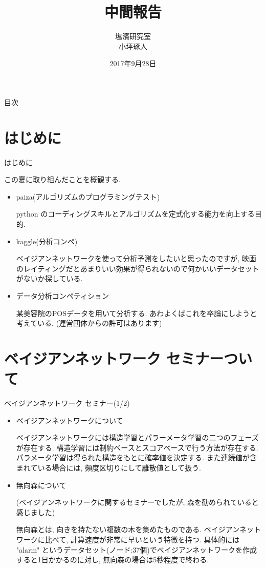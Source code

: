 \documentclass[dvipdfmx]{beamer}
\title[タイトル]{中間報告}
\author[発表者名]{塩濱研究室\\小坪琢人}
\institute[所属]{東京理科大学\ 工学部経営工学科4年\\学籍番号 4414036}
\date[日付]{2017年9月28日}
\begin{document}
\begin{frame}[plain]
\titlepage
\end{frame}
	
\begin{frame}{目次}
\tableofcontents
\end{frame}

\section{はじめに}
\begin{frame}{はじめに}

この夏に取り組んだことを概観する.

\begin{itemize}

\item paiza(アルゴリズムのプログラミングテスト)

python のコーディングスキルとアルゴリズムを定式化する能力を向上する目的.

\item kaggle(分析コンペ)

ベイジアンネットワークを使って分析予測をしたいと思ったのですが, 映画のレイティングだとあまりいい効果が得られないので何かいいデータセットがないか探している.

\item データ分析コンペティション

某美容院のPOSデータを用いて分析する. あわよくばこれを卒論にしようと考えている. (運営団体からの許可はあります)

\end{itemize}
\end{frame}

\section{ベイジアンネットワーク セミナーついて}
\begin{frame}{ベイジアンネットワーク セミナー(1/2)}
\begin{itemize} 
\item{ベイジアンネットワークについて}
\vspace{0.3cm}

ベイジアンネットワークには構造学習とパラーメータ学習の二つのフェーズが存在する. 構造学習には制約ベースとスコアベースで行う方法が存在する. パラメータ学習は得られた構造をもとに確率値を決定する. また連続値が含まれている場合には, 頻度区切りにして離散値として扱う.

\item{無向森について}

\vspace{0.3cm}

(ベイジアンネットワークに関するセミナーでしたが, 森を勧められていると感じました)

無向森とは, 向きを持たない複数の木を集めたものである. ベイジアンネットワークに比べて, 計算速度が非常に早いという特徴を持つ. 具体的には "alarm" というデータセット(ノード:37個)でベイジアンネットワークを作成すると1日かかるのに対し, 無向森の場合は5秒程度で終わる. 

\end{itemize}
\end{frame}
\end{document}
